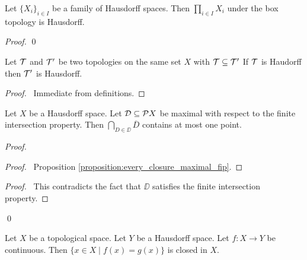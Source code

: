 \begin{proposition}
    Let $\{ X_i \}_{i \in I}$ be a family of Hausdorff spaces. Then $\prod_{i \in I} X_i$ under the box topology is Hausdorff.
\end{proposition}

\begin{proof}
    \pf
    \qed
\end{proof}

\begin{proposition}
    \label{proposition:Hausdorff_finer}
    Let $\mathcal{T}$ and $\mathcal{T}'$ be two topologies on the same set $X$ with $\mathcal{T} \subseteq \mathcal{T}'$
    If $\mathcal{T}$ is Haudorff then $\mathcal{T}'$ is Hausdorff.
\end{proposition}

\begin{proof}
    \pf\ Immediate from definitions.
\end{proof}

\begin{proposition}
    Let $X$ be a Hausdorff space. Let $\mathcal{D} \subseteq \mathcal{P} X$ be maximal
    with respect to the finite intersection property. Then $\bigcap_{D \in \DD}
    \overline{D}$ contains at most one point.
\end{proposition}

\begin{proof}
    \pf
    \begin{proof}
        \pf\ Proposition \ref{proposition:every_closure_maximal_fip}.
    \end{proof}
    \qedstep
    \begin{proof}
        \pf\ This contradicts the fact that $\DD$ satisfies the finite intersection property.
    \end{proof}
    \qed
\end{proof}

\begin{proposition}
    Let $X$ be a topological space. Let $Y$ be a Hausdorff space. Let $f : X
    \rightarrow Y$ be continuous. Then $\{ x \in X \mid f(x) = g(x) \}$
    is closed in $X$.
\end{proposition}

